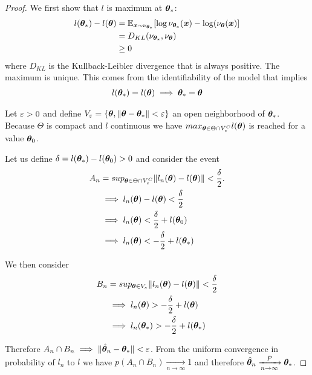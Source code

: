 \begin{proof}
  We first show that $l$ is maximum at $\boldsymbol{\theta}_*$:
  \begin{align}
    l(\boldsymbol{\theta}_*) - l(\boldsymbol{\theta}) &= \mathbb{E}_{\boldsymbol{x} \sim \nu_{\boldsymbol{\theta}_*}}[\log \nu_{\boldsymbol{\theta}_*}(\boldsymbol{x}) - \log(\nu_{\boldsymbol{\theta}}(\boldsymbol{x})] \\
                            &= D_{KL}(\nu_{\boldsymbol{\theta}_*}, \nu_{\boldsymbol{\theta}}) \\ \label{kl-likelihood}
                            &\geq 0
  \end{align}
  where $D_{KL}$ is the Kullback-Leibler divergence that is always positive.
  The maximum is unique. This comes from the identifiability of the model that
  implies
  \begin{align}
    l(\boldsymbol{\theta}_*) = l(\boldsymbol{\theta}) \implies \boldsymbol{\theta}_* = \boldsymbol{\theta}
  \end{align}

  Let $\varepsilon > 0$ and define $V_{\varepsilon} = \{\boldsymbol{\theta}, \|\boldsymbol{\theta} - \boldsymbol{\theta}_*\| <
  \varepsilon\}$ an open neighborhood of $\boldsymbol{\theta}_*$.
  Because $\Theta$ is compact and $l$ continuous we have $max_{\boldsymbol{\theta} \in \Theta
    \cap V_{\varepsilon}^C} l(\boldsymbol{\theta})$ is reached for a value $\boldsymbol{\theta}_0$.
  
  Let us define $\delta = l(\boldsymbol{\theta}_*) - l(\boldsymbol{\theta}_0) > 0$ and consider the event
  \begin{align}
    A_n &= sup_{\boldsymbol{\theta} \in \Theta \cap V_{\varepsilon}^C} \|l_n(\boldsymbol{\theta}) - l(\boldsymbol{\theta})\| < \frac{\delta}{2}. \\
    &\implies l_n(\boldsymbol{\theta}) - l(\boldsymbol{\theta}) < \frac{\delta}{2} \\
    &\implies l_n(\boldsymbol{\theta}) < \frac{\delta}{2} + l(\boldsymbol{\theta}_0) \\
    &\implies l_n(\boldsymbol{\theta}) < -\frac{\delta}{2} + l(\boldsymbol{\theta}_*)
  \end{align}

  We then consider 
  \begin{align}
    B_n &= sup_{\boldsymbol{\theta} \in V_{\varepsilon}} \|l_n(\boldsymbol{\theta}) - l(\boldsymbol{\theta})\| < \frac{\delta}{2} \\
        &\implies l_n(\boldsymbol{\theta}) > -\frac{\delta}{2} + l(\boldsymbol{\theta}) \\
        &\implies l_n(\boldsymbol{\theta}_*) > -\frac{\delta}{2} + l(\boldsymbol{\theta}_*) \\
  \end{align}

  Therefore $A_n \cap B_n \implies \|\hat{\boldsymbol{\theta}}_n - \boldsymbol{\theta}_* \| < \varepsilon$.
  From the uniform convergence in probability of $l_n$ to $l$ we have
  $p(A_n \cap B_n) \xrightarrow[n \rightarrow \infty]{} 1$ and therefore $\hat{\boldsymbol{\theta}}_n \xrightarrow[n \rightarrow \infty]{P} \boldsymbol{\theta}_*$.
\end{proof}

